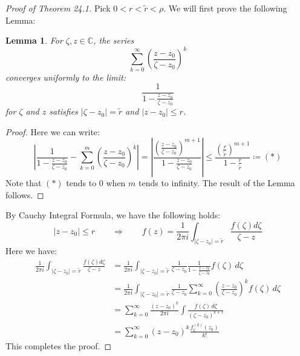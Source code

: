 \documentclass[11pt,oneside]{book}
\theoremstyle{break}
\theoremstyle{break}
\newtheorem{lem}{Lemma}[thm]
\newcommand{\Complex}{\mathbb{C}}
\newcommand{\that}[1]{\widetilde{#1}}
\begin{document}
\begin{proof}[Proof of Theorem 24.1]
Pick $0<r<\that{r} <\rho$. We will first prove the following Lemma:
\begin{lem}
\setlength{\leftskip}{1cm}
For $\zeta,z \in \Complex$, the series $$\sum_{k=0}^\infty \left( \frac{z-z_0}{\zeta - z_0}\right)^k$$
converges uniformly to the limit:
$$\frac{1}{1-\frac{z-z_0}{\zeta - z_0}}$$ 
for $\zeta$ and $z$ satisfies $|\zeta - z_0| = \that{r}$ and $|z-z_0| \leq r$.
\end{lem}

\begin{proof}
\setlength{\leftskip}{1cm} Here we can write:
$$\left|\frac{1}{1-\frac{z-z_0}{\zeta - z_0}} - \sum_{k=0}^m \left( \frac{z-z_0}{\zeta - z_0}\right)^k \right|=\left| \frac{\left(\frac{z-z_0}{\zeta - z_0}\right)^{m+1}}{1- \frac{z-z_0}{\zeta - z_0}}\right| \leq \frac{\left( \frac{r}{\that{r}}\right)^{m+1}}{1-\frac{r}{\that{r}}} \coloneqq (*)$$
Note that $(*)$ tends to $0$ when $m$ tends to infinity. The result of the Lemma follows.
\end{proof}

By Cauchy Integral Formula, we have the following holds:
$$|z-z_0|\leq r \qquad\Rightarrow \qquad f(z) = \frac{1}{2\pi i} \int_{|\zeta - z_0|= \that{r}} \frac{f(\zeta)d\zeta}{\zeta - z}$$
Here we have:
\begin{align*}
\frac{1}{2\pi i} \int_{|\zeta - z_0|= \that{r}} \frac{f(\zeta)d\zeta}{\zeta - z} &= \frac{1}{2\pi i}\int_{|\zeta - z_0|= \that{r}} \frac{1}{\zeta - z_0} \frac{1}{1-\frac{z-z_0}{\zeta - z_0}} f(\zeta) \, d\zeta \\
&= \frac{1}{2\pi i} \int_{|\zeta - z_0| =\that{r}}\frac{1}{\zeta -z_0} \sum_{k=0}^\infty\left(\frac{z-z_0}{\zeta - z_0}\right)^k f(\zeta)\,d\zeta\\
&=\sum_{k=0}^\infty \frac{(z-z_0)^k}{2\pi i} \int \frac{f(\zeta)\, d\zeta}{(\zeta - z_0)^{k+1}} \\
&= \sum_{k=0}^\infty (z-z_0)^k \frac{f^{(k)}_{\Complex} (z_0)}{k!}
\end{align*}
This completes the proof.
\end{proof}
\end{document}
